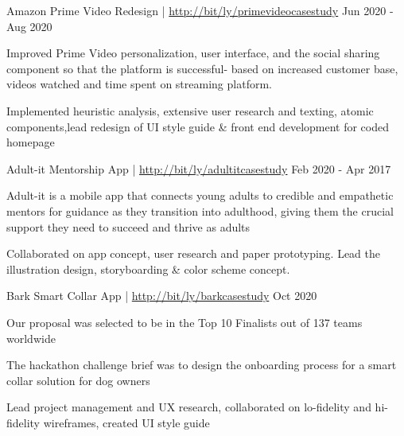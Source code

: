

\begin{cventries2}

  \cventrymini
    {Amazon Prime Video Redesign | \footnotesize \textnormal{\href{http://bit/ly/primevideocasestudy}{http://bit/ly/primevideocasestudy}}} %
    {Jun 2020 - Aug 2020} %
    {
      \begin{cvitems} 
        \item {Improved Prime Video personalization, user interface, and the social sharing component so that the platform is successful- based on increased customer base, videos watched and time spent on streaming platform.}
        \item{Implemented heuristic analysis, extensive user research and texting, atomic components,lead redesign of UI style guide \& front end development for coded homepage}
      \end{cvitems}
    } %
\cventrymini
{Adult-it Mentorship App | \footnotesize \textnormal{\href{http://bit/ly/adultitcasestudy}{http://bit/ly/adultitcasestudy}}} %
{Feb 2020 - Apr 2017} %
{
	\begin{cvitems} 
		\item {Adult-it is a mobile app that connects young adults to credible and empathetic mentors for guidance as they transition into adulthood, giving them the crucial support they need to succeed and thrive as adults}
		\item{Collaborated on app concept, user research and paper prototyping. Lead the illustration design, storyboarding \& color scheme concept.}
	\end{cvitems}
} %

\vspace{2mm}
	\cventrymini
	{Bark Smart Collar App | \footnotesize \textnormal{\href{http://bit/ly/barkcasestudy}{http://bit/ly/barkcasestudy}}} %
	{Oct 2020} %
	{
		\begin{cvitems} 
			\item {Our proposal was selected to be in the Top 10 Finalists out of 137 teams worldwide}
			\item {The hackathon challenge brief was to design the onboarding process for a smart collar solution for dog owners}
			\item{Lead project management and UX research, collaborated on lo-fidelity and hi-fidelity wireframes, created UI style guide}
		\end{cvitems}
	} %
\end{cventries2}    





